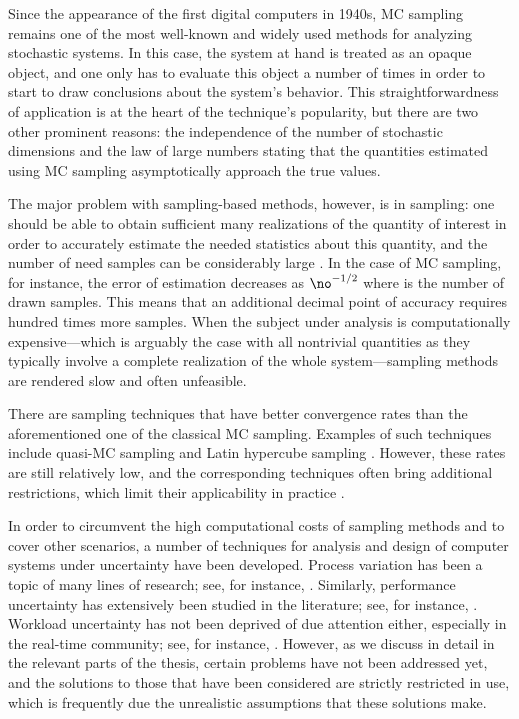 Since the appearance of the first digital computers in 1940s, \ac{MC} sampling
remains one of the most well-known and widely used methods for analyzing
stochastic systems. In this case, the system at hand is treated as an opaque
object, and one only has to evaluate this object a number of times in order to
start to draw conclusions about the system's behavior. This straightforwardness
of application is at the heart of the technique's popularity, but there are two
other prominent reasons: the independence of the number of stochastic dimensions
and the law of large numbers \cite{durrett2010} stating that the quantities
estimated using \ac{MC} sampling asymptotically approach the true values.

The major problem with sampling-based methods, however, is in sampling: one
should be able to obtain sufficient many realizations of the quantity of
interest in order to accurately estimate the needed statistics about this
quantity, and the number of need samples can be considerably large
\cite{diaz-emparanza2002}. In the case of \ac{MC} sampling, for instance, the
error of estimation decreases as $\no^{-1/2}$ where \no is the number of drawn
samples. This means that an additional decimal point of accuracy requires
hundred times more samples. When the subject under analysis is computationally
expensive---which is arguably the case with all nontrivial quantities as they
typically involve a complete realization of the whole system---sampling methods
are rendered slow and often unfeasible.

There are sampling techniques that have better convergence rates than the
aforementioned one of the classical \ac{MC} sampling. Examples of such
techniques include quasi-\ac{MC} sampling and Latin hypercube sampling
\cite{asmussen2007}. However, these rates are still relatively low, and the
corresponding techniques often bring additional restrictions, which limit their
applicability in practice \cite{xiu2010}.

In order to circumvent the high computational costs of sampling methods and to
cover other scenarios, a number of techniques for analysis and design of
computer systems under uncertainty have been developed. Process variation has
been a topic of many lines of research; see, for instance, \cite{bhardwaj2006,
bhardwaj2008, chandra2010, juan2012, lee2013}. Similarly, performance
uncertainty has extensively been studied in the literature; see, for instance,
\cite{coskun2006, huang2009b, das2014c}. Workload uncertainty has not been
deprived of due attention either, especially in the real-time community; see,
for instance, \cite{diaz2002, santinelli2011, quinton2012, tanasa2015}. However,
as we discuss in detail in the relevant parts of the thesis, certain problems
have not been addressed yet, and the solutions to those that have been
considered are strictly restricted in use, which is frequently due the
unrealistic assumptions that these solutions make.
